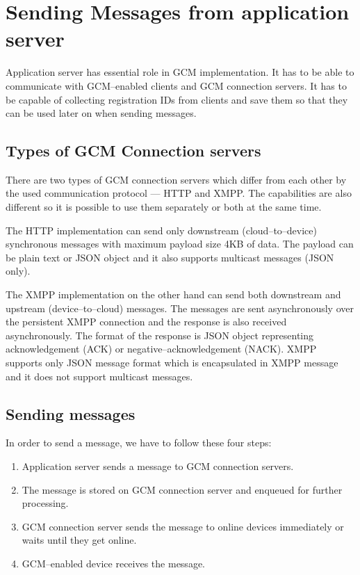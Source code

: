 \section{Sending Messages from application server}
\label{sec:gcm_send}
Application server has essential role in GCM implementation. It has to be able to communicate with GCM--enabled clients and GCM connection servers. It has to be capable of collecting registration IDs from clients and save them so that they can be used later on when sending messages.

\subsection{Types of GCM Connection servers}
There are two types of GCM connection servers which differ from each other by the used communication protocol --- HTTP and XMPP. The capabilities are also different so it is possible to use them separately or both at the same time.

The HTTP implementation can send only downstream (cloud--to--device) synchronous messages with maximum payload size 4KB of data. The payload can be plain text or JSON object and it also supports multicast messages (JSON only).

The XMPP implementation on the other hand can send both downstream and upstream (device--to--cloud) messages. The messages are sent asynchronously over the persistent XMPP connection and the response is also received asynchronously. The format of the response is JSON object representing acknowledgement (ACK) or negative--acknowledgement (NACK). XMPP supports only JSON message format which is encapsulated in XMPP message and it does not support multicast messages.

\subsection{Sending messages}
In order to send a message, we have to follow these four steps:
\begin{enumerate}
	\item Application server sends a message to GCM connection servers.
	\item The message is stored on GCM connection server and enqueued for further processing.
	\item GCM connection server sends the message to online devices immediately or waits until they get online.
	\item GCM--enabled device receives the message.
\end{enumerate}

